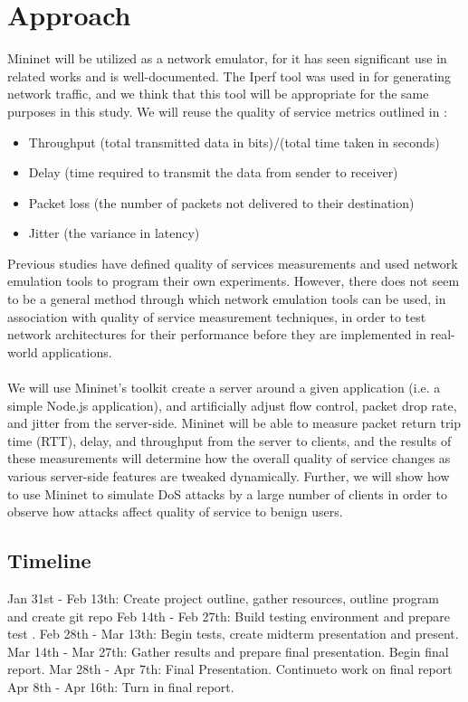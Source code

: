 \documentclass{article}
\begin{document}
\section{Approach}
Mininet will be utilized as a network emulator, for it has seen significant use in related works \cite{mininet_emulation_2014,qos_analysis_2022,chauhan_atulkar_2020} and 
is well-documented. The Iperf tool was used in \cite{chauhan_atulkar_2020} for generating network traffic, and we think that this tool will be appropriate for the same 
purposes in this study. We will reuse the quality of service metrics outlined in \cite{qos_analysis_2022}: 
\begin{itemize}
    \item Throughput (total transmitted data in bits)/(total time taken in seconds)
    \item Delay (time required to transmit the data from sender to receiver)
    \item Packet loss (the number of packets not delivered to their destination)
    \item Jitter (the variance in latency)
\end{itemize} 
Previous studies have defined quality of services measurements and used network emulation tools to program their own experiments. However, there does not seem to be a 
general method through which network emulation tools can be used, in association with quality of service measurement techniques, in order to test network architectures 
for their performance before they are implemented in real-world applications. \\\\
We will use Mininet's toolkit create a server around a given application (i.e. a simple Node.js application), and artificially adjust flow control, packet drop rate, 
and jitter from the server-side. Mininet will be able to measure packet return trip time (RTT), delay, and throughput from the server to clients, and the results of 
these measurements will determine how the overall quality of service changes as various server-side features are tweaked dynamically. Further, we will show how to use 
Mininet to simulate DoS attacks by a large number of clients in order to observe how attacks affect quality of service to benign users. 

\subsection{Timeline}
Jan 31st - Feb 13th: Create project outline, gather resources, outline program and create git repo
Feb 14th - Feb 27th: Build testing environment and prepare test .
Feb 28th - Mar 13th: Begin tests, create midterm presentation and present. 
Mar 14th - Mar 27th: Gather results and prepare final presentation. Begin final report.
Mar 28th - Apr 7th:  Final Presentation. Continueto work on final report
Apr 8th  - Apr 16th: Turn in final report.  
\end{document}
